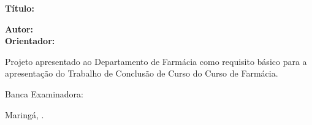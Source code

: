 \begin{minipage}{12cm}
{  \Large \textbf{Título:} \titulo } \\

\bigskip

{  \large \textbf{Autor:}  \autor \\}
{\large \textbf{Orientador:}  \orientador
}

\bigskip

Projeto apresentado ao Departamento de Farmácia como requisito básico para a apresentação do Trabalho de Conclusão de Curso do Curso de Farmácia.

\end{minipage}
\vfill
\hspace{7cm}\begin{minipage}{9cm}
{\Large Banca Examinadora:}\vspace{0.4cm}

\textbf{\membroa}

\insta \vspace{0.4cm}

\textbf{\membrob}

\instb\vspace{0.4cm}

\textbf{\membroc}

\instc \vspace{0.4cm}

 Maringá, \data.
\end{minipage}












 
